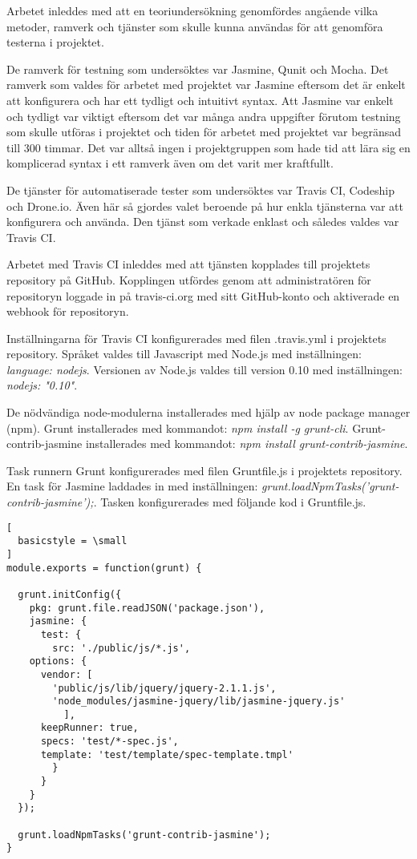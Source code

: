 Arbetet inleddes med att en teoriundersökning genomfördes
angående vilka metoder, ramverk och tjänster som skulle kunna
användas för att genomföra testerna i projektet.

De ramverk för
testning som undersöktes var Jasmine, Qunit och Mocha. Det
ramverk som valdes för arbetet med projektet var Jasmine
eftersom det är enkelt att konfigurera och har ett 
tydligt och intuitivt syntax. Att Jasmine var enkelt och tydligt
var viktigt eftersom det var många andra uppgifter förutom
testning som skulle utföras i projektet och tiden för
arbetet med projektet var begränsad till 300 timmar. Det var
alltså ingen i projektgruppen som hade tid att lära sig 
en komplicerad syntax i ett ramverk även om det varit
mer kraftfullt.

De tjänster för automatiserade tester som undersöktes var
Travis CI, Codeship och Drone.io. Även här 
så gjordes valet beroende på hur enkla tjänsterna var att
konfigurera och använda. Den tjänst som verkade enklast
och således valdes var Travis CI.

Arbetet med Travis CI inleddes med att tjänsten kopplades till 
projektets repository på GitHub. Kopplingen utfördes
genom att administratören för repositoryn loggade in på travis-ci.org med 
sitt GitHub-konto och aktiverade
en webhook för repositoryn.

Inställningarna för Travis CI konfigurerades med filen .travis.yml i projektets
repository. Språket valdes till
Javascript med Node.js med inställningen: \emph{language: node\textunderscore js}.
Versionen av Node.js valdes till version 0.10
med inställningen: \emph{node\textunderscore js: "0.10"}.

De nödvändiga node-modulerna installerades med hjälp av node package manager (npm).
Grunt installerades
med kommandot: \emph{npm install -g grunt-cli}. Grunt-contrib-jasmine installerades med kommandot: 
\emph{npm install grunt-contrib-jasmine}.

Task runnern Grunt konfigurerades med filen Gruntfile.js i projektets repository.
En task för Jasmine laddades in med
inställningen: \emph{grunt.loadNpmTasks('grunt-contrib-jasmine');}.
Tasken konfigurerades med följande kod i Gruntfile.js.

\begin{lstlisting}[
  basicstyle = \small
]
module.exports = function(grunt) {

  grunt.initConfig({
    pkg: grunt.file.readJSON('package.json'),
    jasmine: {
      test: {
        src: './public/js/*.js',
	options: {
	  vendor: [
	    'public/js/lib/jquery/jquery-2.1.1.js',
	    'node_modules/jasmine-jquery/lib/jasmine-jquery.js'
          ],
	  keepRunner: true,
	  specs: 'test/*-spec.js',
	  template: 'test/template/spec-template.tmpl'
        }
      }
    }
  });

  grunt.loadNpmTasks('grunt-contrib-jasmine');
}
\end{lstlisting}

